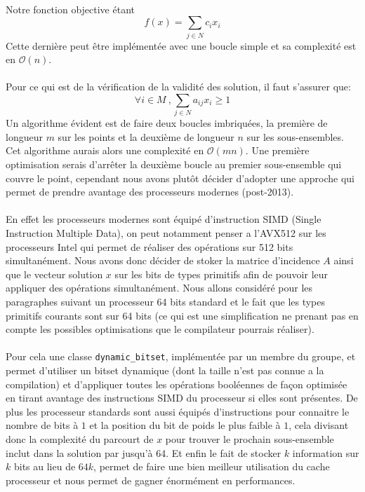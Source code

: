 \documentclass[12pt,letterpaper,twoside]{article}
\begin{document}
			\paragraph*{}
				Notre fonction objective étant
				\[f(x) = \sum_{j \in N}{c_i x_i}\]
				Cette dernière peut être implémentée avec une boucle simple et sa complexité est en \(\mathcal{O}(n)\).
			\paragraph*{}
				Pour ce qui est de la vérification de la validité des solution, il faut s'assurer que:
				\[\forall i \in M\ ,\sum_{j \in N}{a_{ij}x_i} \ge 1\]
				Un algorithme évident est de faire deux boucles imbriquées, la première de longueur \(m\) sur les points et la deuxième de longueur \(n\) sur les sous-ensembles. Cet algorithme aurais alors une complexité en \(\mathcal{O}(mn)\). Une première optimisation serais d’arrêter la deuxième boucle au premier sous-ensemble qui couvre le point, cependant nous avons plutôt décider d'adopter une approche qui permet de prendre avantage des processeurs modernes (post-2013).
			\paragraph*{}
				En effet les processeurs modernes sont équipé d'instruction SIMD (Single Instruction Multiple Data), on peut notamment penser a l'AVX512 sur les processeurs Intel qui permet de réaliser des opérations sur 512 bits simultanément. Nous avons donc décider de stoker la matrice d'incidence \(A\) ainsi que le vecteur solution \(x\) sur les bits de types primitifs \Cpp{} afin de pouvoir leur appliquer des opérations simultanément. Nous allons considéré pour les paragraphes suivant un processeur 64 bits standard et le fait que les types primitifs courants sont sur 64 bits (ce qui est une simplification ne prenant pas en compte les possibles optimisations que le compilateur pourrais réaliser).
			\paragraph*{}
				Pour cela une classe \texttt{dynamic\_bitset}\cite{dynamicbitset}, implémentée par un membre du groupe, et permet d'utiliser un bitset dynamique (dont la taille n'est pas connue a la compilation) et d'appliquer toutes les opérations booléennes de façon optimisée en tirant avantage des instructions SIMD du processeur si elles sont présentes. De plus les processeur standards sont aussi équipés d'instructions pour connaitre le nombre de bits à \(1\) et la position du bit de poids le plus faible à \(1\), cela divisant donc la complexité du parcourt de \(x\) pour trouver le prochain sous-ensemble inclut dans la solution par jusqu’à 64. Et enfin le fait de stocker \(k\) information sur \(k\) bits au lieu de \(64k\), permet de faire une bien meilleur utilisation du cache processeur et nous permet de gagner énormément en performances.
\end{document}
